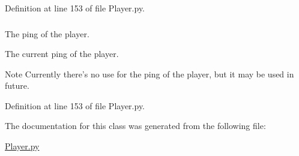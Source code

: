 \-Definition at line 153 of file \-Player.\-py.

\hypertarget{class_player_1_1_player_a6c97a80a0d9b94e21964461cf6acd559}{
\subsubsection[{ping}]{}}
\label{class_player_1_1_player_a6c97a80a0d9b94e21964461cf6acd559}


\-The ping of the player. 

\-The current ping of the player. \begin{DoxyNote}{\-Note}
\-Currently there's no use for the ping of the player, but it may be used in future. 
\end{DoxyNote}


\-Definition at line 153 of file \-Player.\-py.



\-The documentation for this class was generated from the following file\-:\begin{DoxyCompactItemize}
\item 
\hyperlink{_player_8py}{\-Player.\-py}\end{DoxyCompactItemize}
